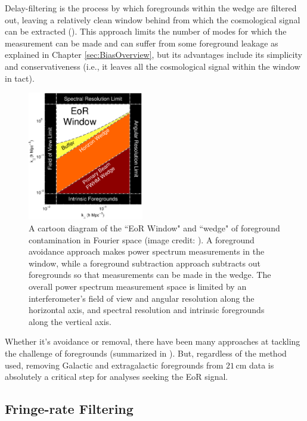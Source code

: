 Delay-filtering is the process by which foregrounds within the wedge are filtered out, leaving a relatively clean window behind from which the cosmological signal can be extracted (\citealt{parsons_et_al2012b}). This approach limits the number of modes for which the measurement can be made and can suffer from some foreground leakage as explained in Chapter \ref{sec:BiasOverview}, but its advantages include its simplicity and conservativeness (i.e., it leaves all the cosmological signal within the window in tact).

\begin{figure}
    \centering
    \includegraphics[width=0.45\textwidth]{plots/wedge.pdf}
    \caption{A cartoon diagram of the ``EoR Window" and ``wedge" of foreground contamination in Fourier space (image credit: \citet{dillon_et_al2015b}). A foreground avoidance approach makes power spectrum measurements in the window, while a foreground subtraction approach subtracts out foregrounds so that measurements can be made in the wedge. The overall power spectrum measurement space is limited by an interferometer's field of view and angular resolution along the horizontal axis, and spectral resolution and intrinsic foregrounds along the vertical axis.}
    \label{fig:wedge}
\end{figure}

Whether it's avoidance or removal, there have been many approaches at tackling the challenge of foregrounds (summarized in \citet{chapman_et_al2016}). But, regardless of the method used, removing Galactic and extragalactic foregrounds from $21$\,cm data is absolutely a critical step for analyses seeking the EoR signal. 

\subsection{Fringe-rate Filtering}
\label{sec:frf_intro}

